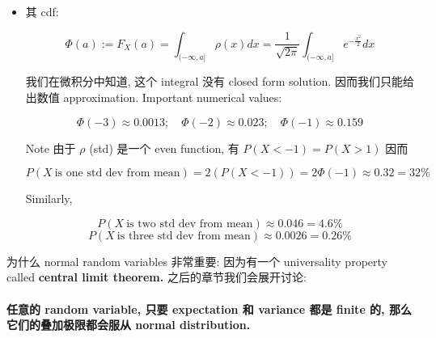 \begin{itemize}
  从而:

  \[\begin{matrix}
  {\mathbb{E}\lbrack\mathit{X}^{\mathit{k}}\rbrack = \{ 0,\quad\mathit{k} = 2\mathit{j} - 1} \\
  {(2\mathit{j} - 1)(2\mathit{j} - 3)\cdots 1 = \frac{(2\mathit{j})!}{2^{\mathit{j}}\mathit{j}!},\quad\mathit{k} = 2\mathit{j}}
  \end{matrix}\]
\item
  其 cdf:

  \[\Phi(\mathit{a}) := \mathit{F}_{\mathit{X}}(\mathit{a}) = \int_{( - \infty,\mathit{a}\rbrack}\mathit{\rho}(\mathit{x})\mathit{d}\mathit{x} = \frac{1}{\sqrt{2\mathit{\pi}}}\int_{( - \infty,\mathit{a}\rbrack}\mathit{e}^{- \frac{\mathit{x}^{2}}{2}}\mathit{d}\mathit{x}\]

  我们在微积分中知道, 这个 integral 没有 closed form solution. 因而我们只能给出数值 approximation. Important numerical values:

  \[\Phi( - 3) \approx 0.0013;\quad\Phi( - 2) \approx 0.023;\quad\Phi( - 1) \approx 0.159\]

  Note 由于 \(\mathit{\rho}\) (std) 是一个 even function, 有 \(\mathit{P}(\mathit{X} < - 1) = \mathit{P}(\mathit{X} > 1)\) 因而

  \[\mathit{P}(\mathit{X}\ \text{is one std dev from mean}) = 2(\mathit{P}(\mathit{X} < - 1)) = 2\Phi( - 1) \approx 0.32 = 32\%\]

  Similarly,

  \[\mathit{P}(\mathit{X}\ \text{is two std dev from mean}) \approx 0.046 = 4.6\%\]\[\mathit{P}(\mathit{X}\ \text{is three std dev from mean}) \approx 0.0026 = 0.26\%\]
\end{itemize}

为什么 normal random variables 非常重要: 因为有一个 universality property called \textbf{central limit theorem.} 之后的章节我们会展开讨论:

\paragraph{\texorpdfstring{任意的 random variable, 只要 expectation 和 variance 都是 finite 的, 那么它们的叠加极限都会服从 normal distribution.\\
}{任意的 random variable, 只要 expectation 和 variance 都是 finite 的, 那么它们的叠加极限都会服从 normal distribution. }}\label{ux4efbux610fux7684-random-variable-ux53eaux8981-expectation-ux548c-variance-ux90fdux662f-finite-ux7684-ux90a3ux4e48ux5b83ux4eecux7684ux53e0ux52a0ux6781ux9650ux90fdux4f1aux670dux4ece-normal-distribution.}

